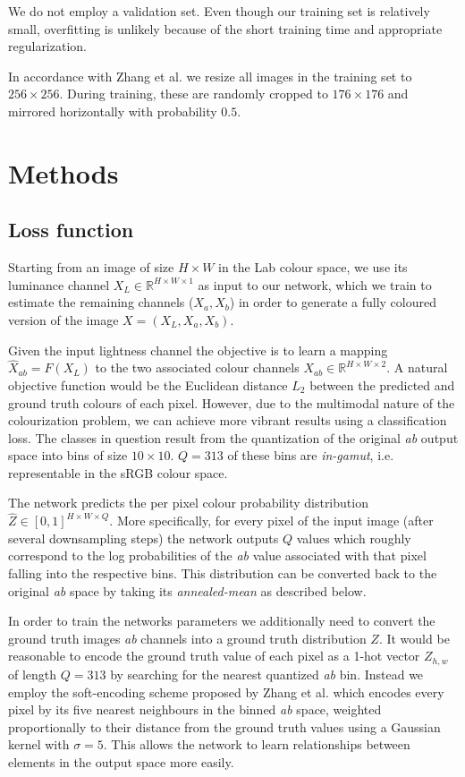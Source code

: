\documentclass{article}
\begin{document}
We do not employ a validation set. Even though our training set is relatively
small, overfitting is unlikely because of the short training time and
appropriate regularization.

In accordance with Zhang et al. we resize all images in the training set to
$256 \times 256$. During training, these are randomly cropped to $176 \times 176$
and mirrored horizontally with probability $0.5$.

\section{Methods}

\subsection{Loss function}

Starting from an image of size $H \times W$ in the Lab colour space, we use its
luminance channel $X_L \in \mathbb{R}^{H \times W \times 1}$ as input to our
network, which we train to estimate the remaining channels ($X_a, X_b$) in
order to generate a fully coloured version of the image $X=(X_L, X_a, X_b)$.

Given the input lightness channel the objective is to learn a mapping
$\hat{X}_{ab} = F(X_L)$ to the two associated colour channels $X_{ab} \in
\mathbb{R}^{H \times W \times 2}$. A natural objective function would be the
Euclidean distance $L_2$ between the predicted and ground truth colours of each
pixel. However, due to the multimodal nature of the colourization problem, we
can achieve more vibrant results using a classification loss. The classes in
question result from the quantization of the original \textit{ab} output space
into bins of size $10 \times 10$. $Q = 313$ of these bins are
\textit{in-gamut}, i.e.  representable in the sRGB colour space.

The network predicts the per pixel colour probability distribution $\hat{Z} \in
[0,1]^{H\times W \times Q}$. More specifically, for every pixel of the input
image (after several downsampling steps) the network outputs $Q$ values which
roughly correspond to the log probabilities of the \textit{ab} value associated
with that pixel falling into the respective bins.  This distribution can be
converted back to the original \textit{ab} space by taking its
\textit{annealed-mean} as described below.

In order to train the networks parameters we additionally need to convert the
ground truth images \textit{ab} channels into a ground truth distribution $Z$.
It would be reasonable to encode the ground truth value of each pixel as a
1-hot vector $Z_{h,w}$ of length $Q = 313$ by searching for the nearest quantized
\textit{ab} bin. Instead we employ the soft-encoding scheme proposed by Zhang
et al. which encodes every pixel by its five nearest neighbours in the binned
\textit{ab} space, weighted proportionally to their distance from the ground
truth values using a Gaussian kernel with $\sigma = 5$. This allows the network
to learn relationships between elements in the output space more easily.
\end{document}
